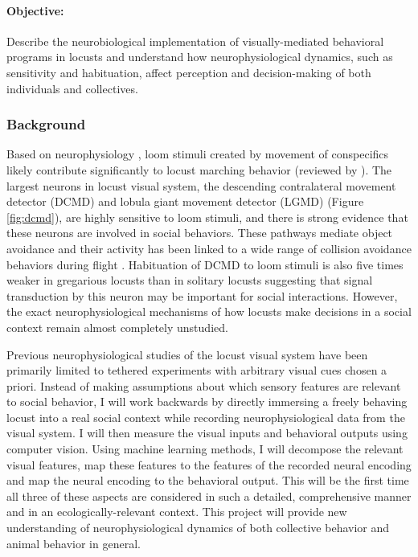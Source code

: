 \documentclass[11pt,a4paper,oneside]{article}
\begin{document}
\paragraph{Objective:} 
Describe the neurobiological implementation of visually-mediated behavioral programs in locusts and understand how neurophysiological dynamics, such as sensitivity and habituation, affect perception and decision-making of both individuals and collectives.
\subsubsection{Background}
Based on neurophysiology \citep{rind2008arousal,rogers2010spatiotemporal}, loom stimuli created by movement of conspecifics likely contribute significantly to locust marching behavior (reviewed by \citealp{simmons2010escapes}). The largest neurons in locust visual system, the descending contralateral movement detector (DCMD) and lobula giant movement detector (LGMD) (Figure \ref{fig:dcmd}), are highly sensitive to loom stimuli, and there is strong evidence that these neurons are involved in social behaviors. These pathways mediate object avoidance \citep{chan2013collision,gabbiani2002multiplicative} and their activity has been linked to a wide range of collision avoidance behaviors during flight \citep{simmons2010escapes}. Habituation of DCMD to loom stimuli is also five times weaker in gregarious locusts than in solitary locusts \citep{matheson2004plasticity} suggesting that signal transduction by this neuron may be important for social interactions. However, the exact neurophysiological mechanisms of how locusts make decisions in a social context remain almost completely unstudied.
\par
Previous neurophysiological studies of the locust visual system have been primarily limited to tethered experiments with arbitrary visual cues chosen a priori. Instead of making assumptions about which sensory features are relevant to social behavior, I will work backwards by directly immersing a freely behaving locust into a real social context while recording neurophysiological data from the visual system. I will then measure the visual inputs and behavioral outputs using computer vision. Using machine learning methods, I will decompose the relevant visual features, map these features to the features of the recorded neural encoding and map the neural encoding to the behavioral output. This will be the first time all three of these aspects are considered in such a detailed, comprehensive manner and in an ecologically-relevant context. This project will provide new understanding of neurophysiological dynamics of both collective behavior and animal behavior in general.
\end{document}

